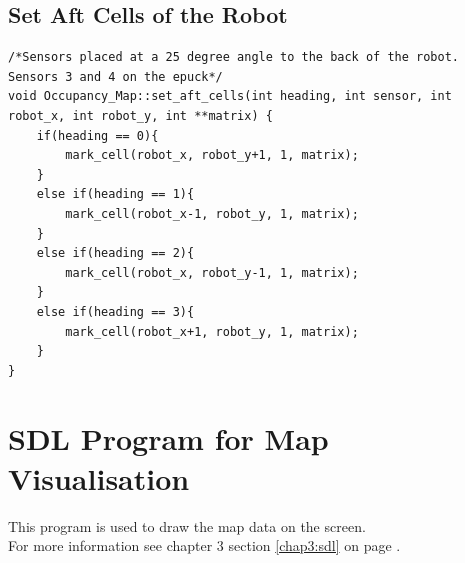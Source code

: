 \subsection{Set Aft Cells of the Robot}
\label{code:set_aft}

\begin{lstlisting}[caption = {Code to set Cells to the Aft of the Robot}]
/*Sensors placed at a 25 degree angle to the back of the robot. Sensors 3 and 4 on the epuck*/
void Occupancy_Map::set_aft_cells(int heading, int sensor, int robot_x, int robot_y, int **matrix) {
    if(heading == 0){
        mark_cell(robot_x, robot_y+1, 1, matrix);
    }
    else if(heading == 1){
        mark_cell(robot_x-1, robot_y, 1, matrix);
    }
    else if(heading == 2){
        mark_cell(robot_x, robot_y-1, 1, matrix);
    }
    else if(heading == 3){
        mark_cell(robot_x+1, robot_y, 1, matrix);
    }
}
\end{lstlisting}

\section{SDL Program for Map Visualisation}
\label{code:sdl}
This program is used to draw the map data on the screen.\\
For more information see chapter 3 section \ref{chap3:sdl} on page \pageref{chap3:sdl}.

